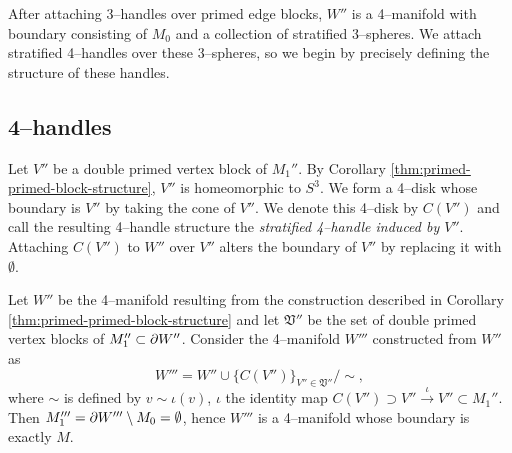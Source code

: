 After attaching 3--handles over primed edge blocks, $W''$ is a 4--manifold with boundary consisting of $M_0$ and a collection of stratified 3--spheres.
We attach stratified 4--handles over these 3--spheres, so we begin by precisely defining the structure of these handles.

\subsection{4--handles}
Let $V''$ be a double primed vertex block of $M_1''$.
By Corollary \ref{thm:primed-primed-block-structure}, $V''$ is homeomorphic to $S^3$.
We form a 4--disk whose boundary is $V''$ by taking the cone of $V''$.
We denote this 4--disk by $C(V'')$ and call the resulting 4--handle structure the \emph{stratified 4--handle induced by $V''$}.
Attaching $C(V'')$ to $W''$ over $V''$ alters the boundary of $V''$ by replacing it with $\emptyset$.

\begin{cor}
	Let $W''$ be the 4--manifold resulting from the construction described in Corollary \ref{thm:primed-primed-block-structure} and let $\mathfrak{V}''$ be the set of double primed vertex blocks of $M_1''\subset\partial W''$.
	Consider the 4--manifold $W'''$ constructed from $W''$ as
	\[
	W''' = W''\cup\{C(V'')\}_{V''\in \mathfrak{V}''} / \sim,
	\]
	where $\sim$ is defined by $v\sim \iota(v)$, $\iota$ the identity map $C(V'')\supset V''\overset{\iota}{\to} V''\subset M_1''$.
	Then $M_1'''=\partial W'''\setminus M_0=\emptyset$, hence $W'''$ is a 4--manifold whose boundary is exactly $M$.
\end{cor}


